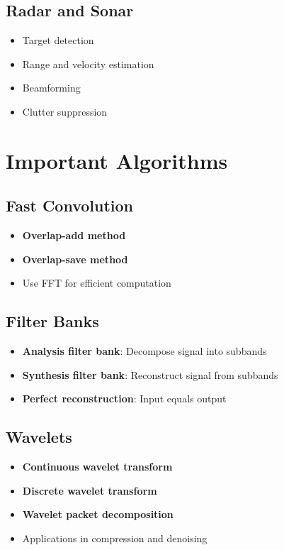 \documentclass[11pt]{article}
\theoremstyle{definition}
\begin{document}
\subsection{Radar and Sonar}
\begin{itemize}
    \item Target detection
    \item Range and velocity estimation
    \item Beamforming
    \item Clutter suppression
\end{itemize}

\section{Important Algorithms}

\subsection{Fast Convolution}
\begin{itemize}
    \item \textbf{Overlap-add method}
    \item \textbf{Overlap-save method}
    \item Use FFT for efficient computation
\end{itemize}

\subsection{Filter Banks}
\begin{itemize}
    \item \textbf{Analysis filter bank}: Decompose signal into subbands
    \item \textbf{Synthesis filter bank}: Reconstruct signal from subbands
    \item \textbf{Perfect reconstruction}: Input equals output
\end{itemize}

\subsection{Wavelets}
\begin{itemize}
    \item \textbf{Continuous wavelet transform}
    \item \textbf{Discrete wavelet transform}
    \item \textbf{Wavelet packet decomposition}
    \item Applications in compression and denoising
\end{itemize}
\end{document}
